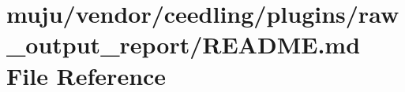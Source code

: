 \hypertarget{vendor_2ceedling_2plugins_2raw__output__report_2_r_e_a_d_m_e_8md}{}\section{muju/vendor/ceedling/plugins/raw\+\_\+output\+\_\+report/\+R\+E\+A\+D\+ME.md File Reference}
\label{vendor_2ceedling_2plugins_2raw__output__report_2_r_e_a_d_m_e_8md}
